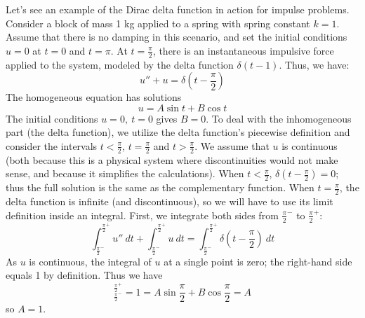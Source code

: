 \documentclass{article}
\begin{document}
Let's see an example of the Dirac delta function in action for impulse problems. Consider a block of mass 1 kg applied to a spring with spring constant $k = 1$. Assume that there is no damping in this scenario, and set the initial conditions $u = 0$ at $t= 0$ and $t=\pi$. At $t = \frac{\pi}{2}$, there is an instantaneous impulsive force applied to the system, modeled by the delta function $\delta(t-1)$. Thus, we have:
\begin{equation*}
    u'' + u = \delta(t-\frac{\pi}{2})
\end{equation*}
The homogeneous equation has solutions
\begin{equation*}
   u =  A\sin t + B \cos t
\end{equation*}
The initial conditions $u=0,\ t=0$ gives $B = 0$. To deal with the inhomogeneous part (the delta function), we utilize the delta function's piecewise definition and consider the intervals $t < \frac{\pi}{2}$, $t = \frac{\pi}{2}$ and $t > \frac{\pi}{2}$. We assume that $u$ is continuous (both because this is a physical system where discontinuities would not make sense, and because it simplifies the calculations). When $t < \frac{\pi}{2}$, $\delta(t-\frac{\pi}{2}) = 0$; thus the full solution is the same as the complementary function. When $t = \frac{\pi}{2}$, the delta function is infinite (and discontinuous), so we will have to use its limit definition inside an integral. First, we integrate both sides from $\frac{\pi}{2}^-$ to $\frac{\pi}{2}^+$:
\begin{equation*}
    \int_{\frac{\pi}{2}^-}^{\frac{\pi}{2}^+} u'' \ dt + \int_{\frac{\pi}{2}^-}^{\frac{\pi}{2}^+} u \ dt = \int_{\frac{\pi}{2}^-}^{\frac{\pi}{2}^+} \delta(t-\frac{\pi}{2})\ dt
\end{equation*}
As $u$ is continuous, the integral of $u$ at a single point is zero; the right-hand side equals 1 by definition. Thus we have
\begin{equation*}
    [u']^{\frac{\pi}{2}^+}_{\frac{\pi}{2}^-} = 1 = A\sin\frac{\pi}{2} + B\cos\frac{\pi}{2} = A
\end{equation*}
so $A = 1$. 
\end{document}

